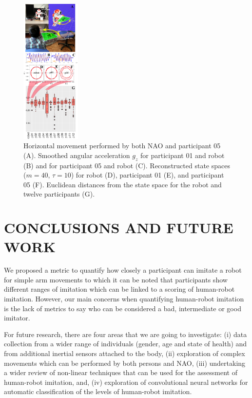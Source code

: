 \documentclass{sig-alternate-05-2015}
\begin{document}
\begin{figure}[ht]
\centering
\includegraphics[width=0.265\textwidth]{fig06}
\caption{
Horizontal movement performed by both NAO and participant 05 (A). 
Smoothed angular acceleration $g_z$ for participant 01  and robot (B)
and for participant 05 and robot (C).
Reconstructed state spaces  ($m=40$, $\tau=10$) for robot (D), participant 01 (E), and participant 05 (F).
Euclidean distances from the state space for the robot and twelve participants (G).
}
\label{fig:main}
\end{figure}






\section{CONCLUSIONS AND FUTURE WORK}
We proposed a metric to quantify how closely a participant can imitate a robot for simple arm
movements to which it can be noted
that participants show different ranges 
of imitation which can be linked to a scoring of human-robot imitation.
However, our main concerns when quantifying human-robot imitation
is the lack of metrics to say who can be considered a bad, intermediate or good imitator.

For future research, there are four areas that we are going to investigate:
(i) data collection from a wider range of individuals (gender, age and state of health)
and from additional inertial sensors attached to the body,
(ii) exploration of complex movements which can be performed by both persons and NAO,
(iii) undertaking a wider review of non-linear techniques that can be used for 
the assessment of human-robot imitation, and, 
(iv) exploration of convolutional neural networks for automatic 
classification of the levels of human-robot imitation.
\end{document}
